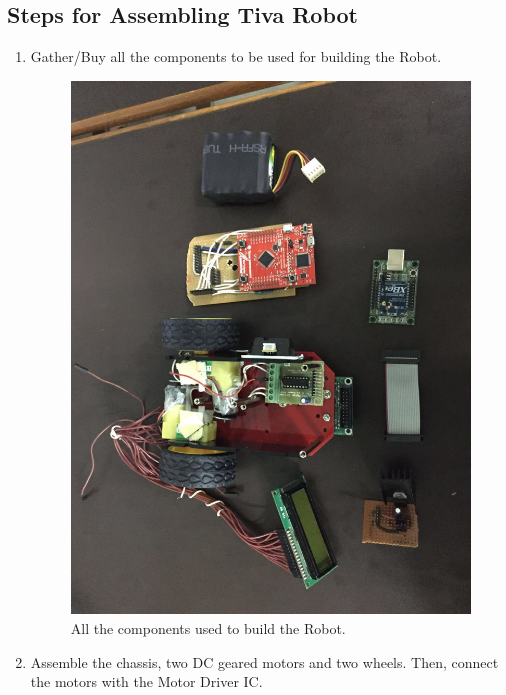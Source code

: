 \documentclass[a4paper,12pt,oneside]{book}
\begin{document}
\subsection{Steps for Assembling Tiva Robot}
\begin{enumerate}
	\item Gather/Buy all the components to be used for building the Robot.
	\begin{figure}[h]
		\centering
		\includegraphics[scale=0.16]{all_components}
		\caption{All the components used to build the Robot.}
	\end{figure}
	\item Assemble the chassis, two DC geared motors and two wheels. Then, connect the motors with the Motor Driver IC.
	\begin{figure}[h]
		\centering

\end{figure}
\end{enumerate}
\end{document}
